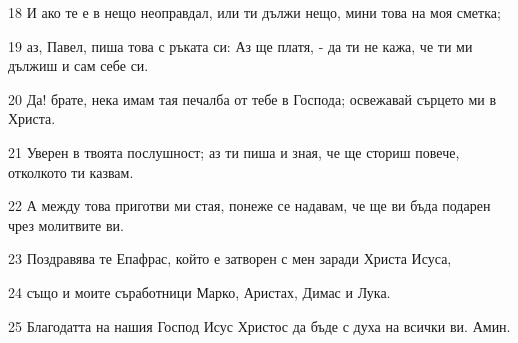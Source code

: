 \par 18 И ако те е в нещо неоправдал, или ти дължи нещо, мини това на моя сметка;
\par 19 аз, Павел, пиша това с ръката си: Аз ще платя, - да ти не кажа, че ти ми дължиш и сам себе си.
\par 20 Да! брате, нека имам тая печалба от тебе в Господа; освежавай сърцето ми в Христа.
\par 21 Уверен в твоята послушност; аз ти пиша и зная, че ще сториш повече, отколкото ти казвам.
\par 22 А между това приготви ми стая, понеже се надавам, че ще ви бъда подарен чрез молитвите ви.
\par 23 Поздравява те Епафрас, който е затворен с мен заради Христа Исуса,
\par 24 също и моите съработници Марко, Аристах, Димас и Лука.
\par 25 Благодатта на нашия Господ Исус Христос да бъде с духа на всички ви. Амин.


